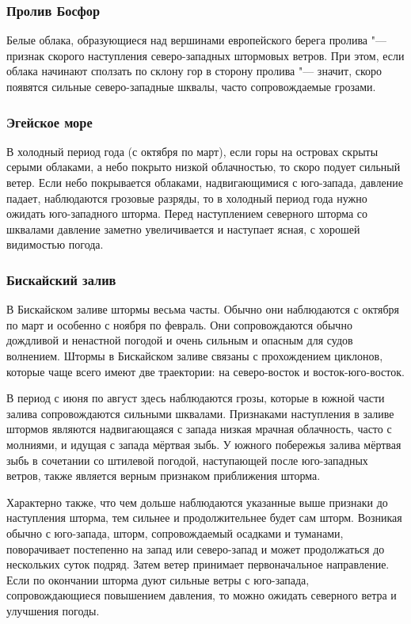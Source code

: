 \subsubsection{Пролив Босфор}

Белые облака, образующиеся над вершинами европейского берега пролива "---
признак скорого наступления северо-западных штормовых ветров. При
этом, если облака начинают сползать по склону гор в сторону пролива "---
значит, скоро появятся сильные северо-западные шквалы, часто
сопровождаемые грозами.

\subsubsection{Эгейское море}

В холодный период года (с октября по март), если горы на островах
скрыты серыми облаками, а небо покрыто низкой облачностью, то скоро
подует сильный ветер. Если небо покрывается облаками, надвигающимися с
юго-запада, давление падает, наблюдаются грозовые разряды, то в
холодный период года нужно ожидать юго-западного шторма. Перед
наступлением северного шторма со шквалами давление заметно
увеличивается и наступает ясная, с хорошей видимостью погода.

\subsubsection{Бискайский залив}

В Бискайском заливе штормы весьма часты. Обычно они наблюдаются с
октября по март и особенно с ноября по февраль. Они сопровождаются
обычно дождливой и ненастной погодой и очень сильным и опасным для
судов волнением. Штормы в Бискайском заливе связаны с прохождением
циклонов, которые чаще всего имеют две траектории: на северо-восток и
восток-юго-восток.

В период с июня по август здесь наблюдаются грозы, которые в южной
части залива сопровождаются сильными шквалами. Признаками наступления
в заливе штормов являются надвигающаяся с запада низкая мрачная
облачность, часто с молниями, и идущая с запада мёртвая зыбь. У южного
побережья залива мёртвая зыбь в сочетании со штилевой погодой,
наступающей после юго-западных ветров, также является верным признаком
приближения шторма.

Характерно также, что чем дольше наблюдаются указанные выше признаки
до наступления шторма, тем сильнее и продолжительнее будет сам
шторм. Возникая обычно с юго-запада, шторм, сопровождаемый осадками и
туманами, поворачивает постепенно на запад или северо-запад и может
продолжаться до нескольких суток подряд. Затем ветер принимает
первоначальное направление. Если по окончании шторма дуют сильные
ветры с юго-запада, сопровождающиеся повышением давления, то можно
ожидать северного ветра и улучшения погоды.

